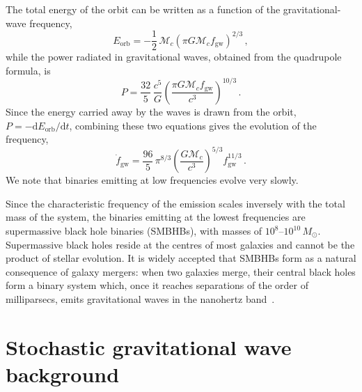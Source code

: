 The total energy of the orbit can be written as a function
of the gravitational-wave frequency,
\begin{equation}
    E_{\mathrm{orb}} = -\frac{1}{2}\,\mathcal{M}_c
    \left(\pi G \mathcal{M}_c f_{\mathrm{gw}}\right)^{2/3}\, ,
    \label{eq:E_orb}
\end{equation}
while the power radiated in gravitational waves, obtained from the quadrupole
formula, is
\begin{equation}
    P = \frac{32}{5}\,\frac{c^5}{G}
    \left(\frac{\pi G \mathcal{M}_c f_{\mathrm{gw}}}{c^3}\right)^{10/3}\, .
    \label{eq:potenza}
\end{equation}
Since the energy carried away by the waves is drawn from the orbit,
$P = -\mathrm{d}E_{\mathrm{orb}}/\mathrm{d}t$, combining these two equations
gives the evolution of the frequency,
\begin{equation}
    \dot f_{\mathrm{gw}} = \frac{96}{5}\,\pi^{8/3}
    \left(\frac{G\mathcal{M}_c}{c^3}\right)^{5/3} f_{\mathrm{gw}}^{11/3}\, .
    \label{eq:chirp}
\end{equation}
We note that binaries emitting at low frequencies evolve very slowly.

Since the characteristic frequency of the emission scales inversely with the
total mass of the system, the binaries emitting at the lowest frequencies are
supermassive black hole binaries (SMBHBs), with masses of
$10^{8}$--$10^{10}\,M_\odot$. Supermassive black holes reside at the centres of most galaxies and cannot be
the product of stellar evolution. It is widely accepted that SMBHBs form as a
natural consequence of galaxy mergers: when two galaxies merge, their central
black holes form a binary system which, once it reaches separations of the
order of milliparsecs, emits gravitational waves in the nanohertz band~\cite{Taylor2021,Sesana2008}.


\section{Stochastic gravitational wave background} \label{sec:GWB}

